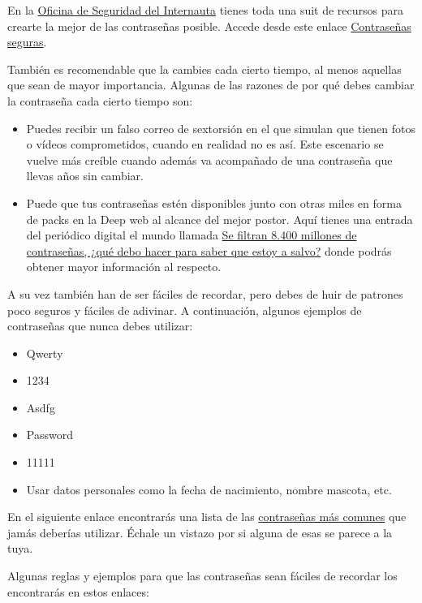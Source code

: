 \documentclass[
  a4paper,
  openany]{book}
\begin{document}
En la \href{https://www.osi.es/es}{Oficina de Seguridad del Internauta} tienes toda una suit de recursos para crearte la mejor de las contraseñas posible. Accede desde este enlace \href{https://www.osi.es/es/campanas/contrasenas-seguras}{Contraseñas seguras}.

También es recomendable que la cambies cada cierto tiempo, al menos aquellas que sean de mayor importancia. Algunas de las razones de por qué debes cambiar la contraseña cada cierto tiempo son:

\begin{itemize}
\item
  Puedes recibir un falso correo de sextorsión en el que simulan que tienen fotos o vídeos comprometidos, cuando en realidad no es así. Este escenario se vuelve más creíble cuando además va acompañado de una contraseña que llevas años sin cambiar.
\item
  Puede que tus contraseñas estén disponibles junto con otras miles en forma de packs en la Deep web al alcance del mejor postor. Aquí tienes una entrada del periódico digital el mundo llamada \href{https://www.elmundo.es/tecnologia/2021/06/08/60bf3b2a21efa0ae7f8b462e.html}{Se filtran 8.400 millones de contraseñas, ¿qué debo hacer para saber que estoy a salvo?} donde podrás obtener mayor información al respecto.
\end{itemize}

A su vez también han de ser fáciles de recordar, pero debes de huir de patrones poco seguros y fáciles de adivinar. A continuación, algunos ejemplos de contraseñas que nunca debes utilizar:

\begin{itemize}
\item
  Qwerty
\item
  1234
\item
  Asdfg
\item
  Password
\item
  11111
\item
  Usar datos personales como la fecha de nacimiento, nombre mascota, etc.
\end{itemize}

En el siguiente enlace encontrarás una lista de las \href{https://nordpass.com/most-common-passwords-list/}{contraseñas más comunes} que jamás deberías utilizar. Échale un vistazo por si alguna de esas se parece a la tuya.

Algunas reglas y ejemplos para que las contraseñas sean fáciles de recordar los encontrarás en estos enlaces:
\end{document}

